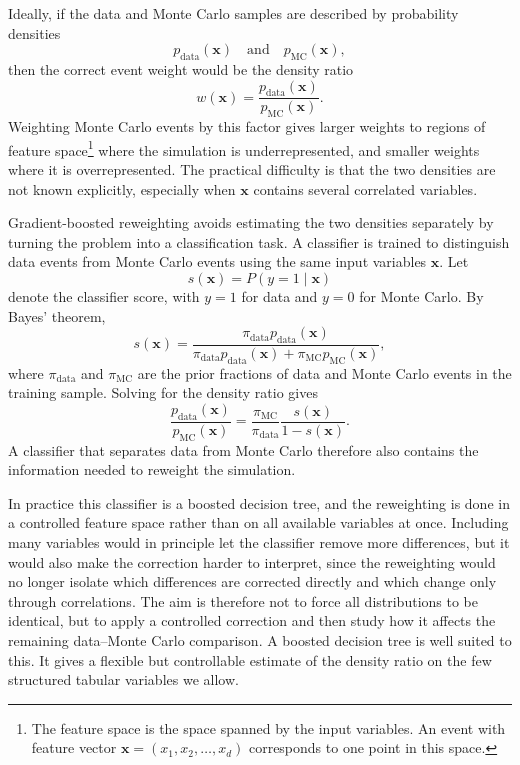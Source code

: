 Ideally, if the data and Monte Carlo samples are described by probability densities
\[
    p_{\mathrm{data}}(\mathbf{x})
    \quad \text{and} \quad
    p_{\mathrm{MC}}(\mathbf{x}),
\]
then the correct event weight would be the density ratio
\[
    w(\mathbf{x})
    =
    \frac{p_{\mathrm{data}}(\mathbf{x})}
         {p_{\mathrm{MC}}(\mathbf{x})}.
\]
Weighting Monte Carlo events by this factor gives larger weights to regions of feature space\footnote{The feature space is the space spanned by the input variables. An event with feature vector $\mathbf{x} = (x_1,x_2,\ldots,x_d)$ corresponds to one point in this space.} where the simulation is underrepresented, and smaller weights where it is overrepresented. The practical difficulty is that the two densities are not known explicitly, especially when $\mathbf{x}$ contains several correlated variables.

Gradient-boosted reweighting avoids estimating the two densities separately by turning the problem into a classification task. A classifier is trained to distinguish data events from Monte Carlo events using the same input variables $\mathbf{x}$. Let
\[
    s(\mathbf{x}) = P(y=1 \mid \mathbf{x})
\]
denote the classifier score, with $y=1$ for data and $y=0$ for Monte Carlo. By Bayes' theorem,
\[
    s(\mathbf{x})
    =
    \frac{\pi_{\mathrm{data}} p_{\mathrm{data}}(\mathbf{x})}
         {\pi_{\mathrm{data}} p_{\mathrm{data}}(\mathbf{x})
         + \pi_{\mathrm{MC}} p_{\mathrm{MC}}(\mathbf{x})},
\]
where $\pi_{\mathrm{data}}$ and $\pi_{\mathrm{MC}}$ are the prior fractions of data and Monte Carlo events in the training sample. Solving for the density ratio gives
\[
    \frac{p_{\mathrm{data}}(\mathbf{x})}
         {p_{\mathrm{MC}}(\mathbf{x})}
    =
    \frac{\pi_{\mathrm{MC}}}{\pi_{\mathrm{data}}}
    \frac{s(\mathbf{x})}{1-s(\mathbf{x})}.
\]
A classifier that separates data from Monte Carlo therefore also contains the information needed to reweight the simulation.

In practice this classifier is a boosted decision tree, and the reweighting is done in a controlled feature space rather than on all available variables at once. Including many variables would in principle let the classifier remove more differences, but it would also make the correction harder to interpret, since the reweighting would no longer isolate which differences are corrected directly and which change only through correlations. The aim is therefore not to force all distributions to be identical, but to apply a controlled correction and then study how it affects the remaining data--Monte Carlo comparison. A boosted decision tree is well suited to this. It gives a flexible but controllable estimate of the density ratio on the few structured tabular variables we allow.



